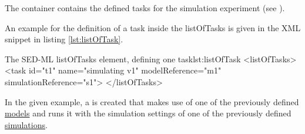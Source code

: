 \label{sec:listOfTasks}
%
%
The  container contains the defined tasks for the simulation experiment (see ).

An example for the definition of a task inside the listOfTasks is given in the XML snippet in listing \ref{lst:listOfTask}.
\begin{myXmlLst}{The SED-ML listOfTasks element, defining one task}{lst:listOfTask}
<listOfTasks>
 <task id="t1" name="simulating v1" modelReference="m1" simulationReference="s1">
</listOfTasks>
\end{myXmlLst}
%
In the given example, a  is created that makes use of one of the previously defined \hyperref[class:model]{models} and runs it with  the simulation settings of one of the previously defined \hyperref[class:simulation]{simulations}.

